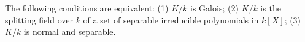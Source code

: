 The following conditions are equivalent: (1) $K/k$ is Galois; (2) $K/k$ is the splitting field over $k$ of a set of separable irreducible polynomials in $k[X]$; (3) $K/k$ is normal and separable.
